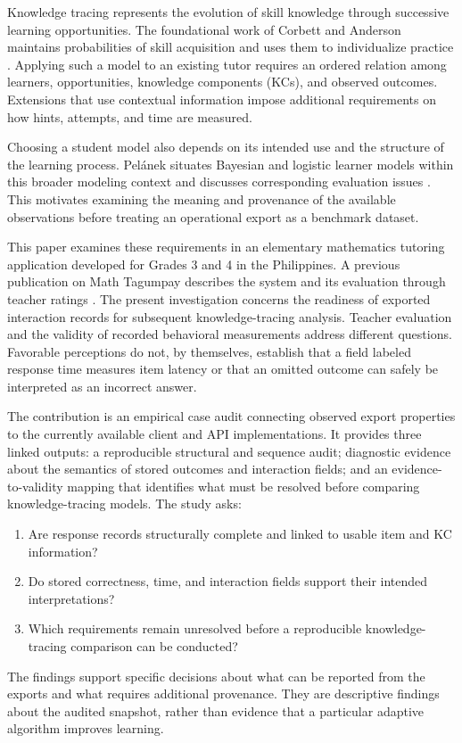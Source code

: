 \documentclass[conference]{IEEEtran}
\begin{document}
Knowledge tracing represents the evolution of skill knowledge through successive learning opportunities. The foundational work of Corbett and Anderson maintains probabilities of skill acquisition and uses them to individualize practice \cite{corbett1994}. Applying such a model to an existing tutor requires an ordered relation among learners, opportunities, knowledge components (KCs), and observed outcomes. Extensions that use contextual information impose additional requirements on how hints, attempts, and time are measured.

Choosing a student model also depends on its intended use and the structure of the learning process. Pel{\'{a}}nek situates Bayesian and logistic learner models within this broader modeling context and discusses corresponding evaluation issues \cite{pelanek2017}. This motivates examining the meaning and provenance of the available observations before treating an operational export as a benchmark dataset.

This paper examines these requirements in an elementary mathematics tutoring application developed for Grades 3 and 4 in the Philippines. A previous publication on Math Tagumpay describes the system and its evaluation through teacher ratings \cite{ruiz2026}. The present investigation concerns the readiness of exported interaction records for subsequent knowledge-tracing analysis. Teacher evaluation and the validity of recorded behavioral measurements address different questions. Favorable perceptions do not, by themselves, establish that a field labeled response time measures item latency or that an omitted outcome can safely be interpreted as an incorrect answer.

The contribution is an empirical case audit connecting observed export properties to the currently available client and API implementations. It provides three linked outputs: a reproducible structural and sequence audit; diagnostic evidence about the semantics of stored outcomes and interaction fields; and an evidence-to-validity mapping that identifies what must be resolved before comparing knowledge-tracing models. The study asks:
\begin{enumerate}
\item Are response records structurally complete and linked to usable item and KC information?
\item Do stored correctness, time, and interaction fields support their intended interpretations?
\item Which requirements remain unresolved before a reproducible knowledge-tracing comparison can be conducted?
\end{enumerate}
The findings support specific decisions about what can be reported from the exports and what requires additional provenance. They are descriptive findings about the audited snapshot, rather than evidence that a particular adaptive algorithm improves learning.
\end{document}
